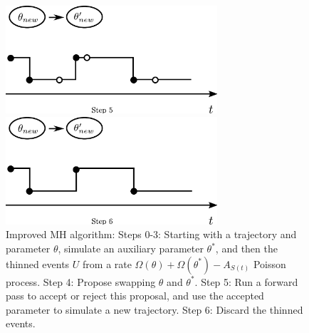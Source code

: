 \begin{figure}[h!]
\begin{minipage}[hp]{0.45\linewidth}
    \vspace{-0 in}
  \end{minipage}
  \begin{minipage}[hp]{0.45\linewidth}
  \centering
    \includegraphics [width=0.70\textwidth, angle=0]{figs/plot5.pdf}
    \vspace{-0 in}
  \end{minipage}
  \begin{minipage}[hp]{0.45\linewidth}
  \centering
    \includegraphics [width=0.70\textwidth, angle=0]{figs/plot6.pdf}
  \end{minipage}
    \caption{Improved MH algorithm: Steps 0-3: Starting with a trajectory and parameter $\theta$,
      simulate an auxiliary parameter $\theta^*$, and then the thinned events
      $U$ from a rate $\Omega(\theta) + \Omega(\theta^*) - A_{S(t)}$ Poisson
      process. Step 4: Propose swapping $\theta$ and $\theta^*$. Step 5:
      Run a forward pass to accept or reject this proposal, and use the accepted
    parameter to simulate a new trajectory. Step 6: Discard the thinned events.} 
   \label{fig:MH_improved}
  \end{figure}

